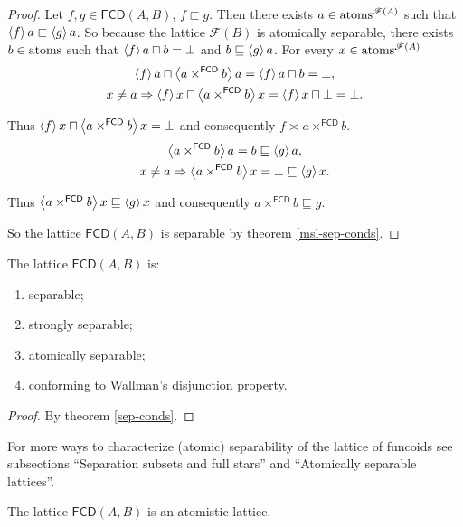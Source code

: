 \begin{proof}
Let $f,g\in\mathsf{FCD}(A,B)$, $f\sqsubset g$. Then there exists
$a\in\operatorname{atoms}^{\mathscr{F}(A)}$ such that $\left\langle f\right\rangle a\sqsubset\left\langle g\right\rangle a$.
So because the lattice $\mathscr{F}(B)$ is atomically separable,
there exists $b\in\operatorname{atoms}$ such that $\left\langle f\right\rangle a\sqcap
b=\bot$
and $b\sqsubseteq\left\langle g\right\rangle a$. For every $x\in\operatorname{atoms}^{\mathscr{F}(A)}$
\begin{gather*}
\left\langle f\right\rangle a\sqcap\left\langle a\times^{\mathsf{FCD}}b\right\rangle a=\left\langle f\right\rangle a\sqcap
b=\bot,\\
x\ne a\Rightarrow\left\langle f\right\rangle x\sqcap\left\langle a\times^{\mathsf{FCD}}b\right\rangle x=\left\langle f\right\rangle x\sqcap\bot=\bot.
\end{gather*}


Thus $\left\langle f\right\rangle x\sqcap\left\langle a\times^{\mathsf{FCD}}b\right\rangle x=\bot$
and consequently $f\asymp a\times^{\mathsf{FCD}}b$.
\begin{gather*}
\left\langle a\times^{\mathsf{FCD}}b\right\rangle a=b\sqsubseteq\left\langle g\right\rangle a,\\
x\ne
a\Rightarrow\left\langle a\times^{\mathsf{FCD}}b\right\rangle x=\bot
\sqsubseteq\left\langle g\right\rangle x.
\end{gather*}


Thus $\left\langle a\times^{\mathsf{FCD}}b\right\rangle x\sqsubseteq\left\langle g\right\rangle x$ and
consequently $a\times^{\mathsf{FCD}}b\sqsubseteq g$.

So the lattice $\mathsf{FCD}(A,B)$ is separable by theorem
\ref{msl-sep-conds}.\end{proof}
\begin{cor}
\label{fcd-is-sep}The lattice $\mathsf{FCD}(A,B)$ is:
\begin{enumerate}
\item separable;
\item strongly separable;
\item atomically separable;
\item conforming to Wallman's disjunction property.
\end{enumerate}
\end{cor}
\begin{proof}
By theorem \ref{sep-conds}.\end{proof}
\begin{rem}
For more ways to characterize (atomic) separability of the lattice
of funcoids see subsections ``Separation subsets and full stars''
and ``Atomically separable lattices''.\end{rem}
\begin{cor}
The lattice $\mathsf{FCD}(A,B)$ is an atomistic lattice.\end{cor}
